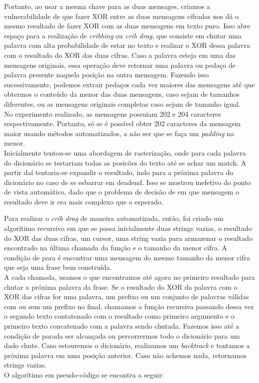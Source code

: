 \documentclass[10pt]{article}
\begin{document}
        Portanto, ao usar a mesma chave para as duas mensages, criamos a vulnerabilidade de que fazer XOR entre as duas 
        mensagens cifradas nos dá o mesmo resultado de fazer XOR com as duas mensagens em texto puro. Isso abre espaço 
        para a realização de \textit{cribbing} ou \textit{crib drag}, que consiste em chutar uma palavra com alta probabilidade
        de estar no texto e realizar o XOR dessa palavra com o resultado do XOR das duas cifras. Caso a palavra esteja em uma
        das mensagens originais, essa operação deve retornar uma palavra ou pedaço de palavra presente naquela posição na
        outra mensagem. Fazendo isso sucessivamente, podemos extrair pedaços cada vez maiores das mensagens até que obtermos
        o conteúdo da menor das duas mensagens, caso sejam de tamanhos diferentes, ou as mensagens originais completas caso
        sejam de tamanho igual. \\

        No experimento realizado, as mensagens possuiam 202 e 204 caracteres respectivamente. Portanto, só se é possível
        obter 202 caracteres da mensagem maior usando métodos automatizados, a não ser que se faça um \textit{padding} na
        menor. \\

        Inicialmente tentou-se uma abordagem de rasterização, onde para cada palavra do dicionário se testariam todas as posicões do texto até se achar um match. A partir daí tentaria-se expandir o resultado, indo para a próxima palavra do dicionário no caso de se esbarrar em deadend. Isso se mostrou inefetivo do ponto de vista automático, dado que o problema de decisão de em que mensagem o resultado deve ir era mais complexo que o esperado.

        Para realizar o \textit{crib drag} de maneira automatizada, então, foi criado um algoritimo recursivo em que se passa inicialmente duas strings vazias, o resultado do XOR das duas cifras, um cursor, uma string vazia para armazenar o resultado encontrado na última chamada da função e o tamanho da menor cifra. A condição de para é encontrar uma mensagem do mesmo tamanho da menor cifra que seja uma frase bem construída. \\

        A cada chamada, usamos o que encontramos até agora no primeiro resultado para chutar a próxima palavra da frase. Se o resultado do XOR da palavra com o XOR das cifras for uma palavra, um prefixo ou um conjunto de palavras válidas com ou sem um prefixo no final, chamamos a função recursiva passando dessa vez o segundo texto contatenado com o resultado como primeiro argumento e o primeiro texto concatenado com a palavra sendo chutada. Fazemos isso até a condição de parada ser alcançada ou percorrermos todo o dicionário para um dado chute. Caso estouremos o dicionário, realizamos um \textit{backtrack} e tentamos a próxima palavra em uma posição anterior. Caso não achemos nada, retornamos strings vazias. \\
        \newpage
        O algorítimo em pseudo-código se encontra a seguir:
\end{document}
